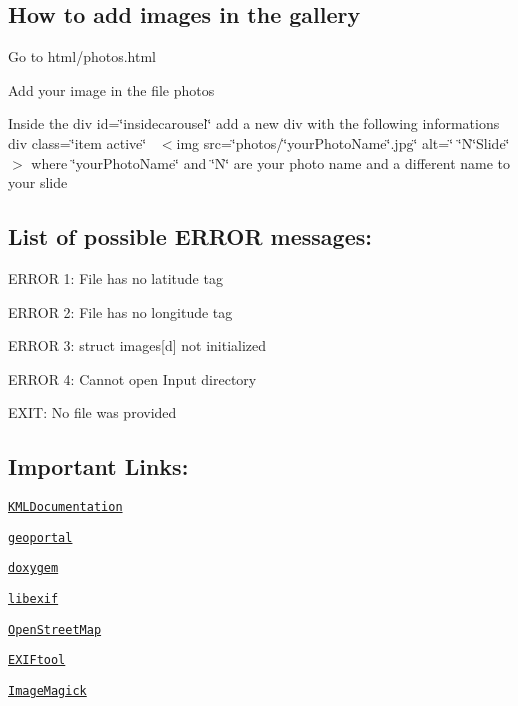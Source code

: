 \subsection*{How to add images in the gallery}


\begin{DoxyEnumerate}
\item Go to html/photos.\+html 
\item Add your image in the file photos 
\item Inside the div id=\char`\"{}insidecarousel\char`\"{} add a new div with the following informations~\newline
 div class=\char`\"{}item active\char`\"{}~\newline
$<$img src=\char`\"{}photos/\char`\"{}your\+Photo\+Name\char`\"{}.\+jpg\char`\"{} alt=\char`\"{} \char`\"{}N\char`\"{}\+Slide\char`\"{}$>$ where \char`\"{}your\+Photo\+Name\char`\"{} and \char`\"{}\+N\char`\"{} are your photo name and a different name to your slide  
\end{DoxyEnumerate}

\subsection*{List of possible E\+R\+R\+OR messages\+:}


\begin{DoxyEnumerate}
\item E\+R\+R\+OR 1\+: File has no latitude tag 
\item E\+R\+R\+OR 2\+: File has no longitude tag 
\item E\+R\+R\+OR 3\+: struct images\mbox{[}d\mbox{]} not initialized 
\item E\+R\+R\+OR 4\+: Cannot open Input directory 
\item E\+X\+IT\+: No file was provided 
\end{DoxyEnumerate}

\subsection*{Important Links\+:}


\begin{DoxyEnumerate}
\item \href{https://developers.google.com/kml/documentation/}{\tt K\+M\+L\+Documentation} 
\item \href{https://www.geoportail.gouv.fr/carte}{\tt geoportal} 
\item \href{http://www.stack.nl/~dimitri/doxygen/manual/index.html}{\tt doxygem} 
\item \href{http://libexif.sourceforge.net/api/}{\tt libexif} 
\item \href{https://www.openstreetmap.org/}{\tt Open\+Street\+Map} 
\item \href{http://www.sno.phy.queensu.ca/~phil/exiftool/}{\tt E\+X\+I\+Ftool} 
\item \href{https://www.imagemagick.org/script/index.php}{\tt Image\+Magick}


\end{DoxyEnumerate}